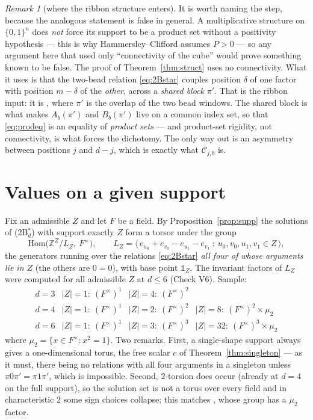 \documentclass[11pt]{article}
\theoremstyle{definition}
\theoremstyle{remark}
\newtheorem{remark}[theorem]{Remark}
\newcommand{\Z}{\mathbb{Z}}
\newcommand{\Cset}{\mathcal{C}}
\newcommand{\one}{\mathbb{1}}
\newcommand{\cube}{\{0,1\}}
\begin{document}
\begin{remark}[where the ribbon structure enters]\label{rem:whereribbon}
It is worth naming the step, because the analogous statement is false in general.  A
multiplicative structure on $\cube^{n}$ does \emph{not} force its support to be a product set
without a positivity hypothesis --- this is why Hammersley--Clifford assumes $P>0$ --- so any
argument here that used only ``connectivity of the cube'' would prove something known to be
false.  The proof of Theorem~\ref{thm:struct} uses no connectivity.  What it uses is that the
two-bead relation \eqref{eq:2Bstar} couples position $\delta$ of one factor with position
$m-\delta$ of the \emph{other}, across a \emph{shared block} $\pi'$.  That is the ribbon input:
it is \cite[Lemma 4.3]{Q149}, where $\pi'$ is the overlap of the two bead windows.  The shared
block is what makes $A_b(\pi')$ and $B_b(\pi')$ live on a common index set, so that
\eqref{eq:prodeq} is an equality of \emph{product sets} --- and product-set rigidity, not
connectivity, is what forces the dichotomy.  The only way out is an asymmetry between positions
$j$ and $d-j$, which is exactly what $\Cset_{j,b}$ is.
\end{remark}

\section{Values on a given support}\label{sec:values}

Fix an admissible $Z$ and let $F$ be a field.  By Proposition~\ref{prop:supp} the solutions of
\textnormal{(2B$^*_d$)} with support exactly $Z$ form a torsor under the group
\[
   \mathrm{Hom}\bigl(\Z^{Z}/L_Z,\ F^\times\bigr),\qquad
   L_Z=\bigl\langle\, e_{u_0}+e_{v_0}-e_{u_1}-e_{v_1}\ :\
      u_0,v_0,u_1,v_1\in Z \,\bigr\rangle ,
\]
the generators running over the relations \eqref{eq:2Bstar} \emph{all four of whose arguments lie
in $Z$} (the others are $0=0$), with base point $\one_Z$.  The invariant factors of $L_Z$ were
computed for all admissible $Z$ at $d\le6$ (Check V6).  Sample:
\[
\begin{array}{llll}
 d=3 & |Z|=1:\ (F^\times)^1 & |Z|=4:\ (F^\times)^2\\
 d=4 & |Z|=1:\ (F^\times)^1 & |Z|=2:\ (F^\times)^2 & |Z|=8:\ (F^\times)^2\times\mu_2\\
 d=6 & |Z|=1:\ (F^\times)^1 & |Z|=3:\ (F^\times)^3 & |Z|=32:\ (F^\times)^3\times\mu_2
\end{array}
\]
where $\mu_2=\{x\in F^\times:x^2=1\}$.  Two remarks.  First, a single-shape support always gives
a one-dimensional torus, the free scalar $c$ of Theorem~\ref{thm:singleton} --- as it must,
there being no relations with all four arguments in a singleton unless
$\pi0\pi'=\pi1\pi'$, which is impossible.  Second, $2$-torsion does occur (already at $d=4$ on
the full support), so the solution set is not a torus over every field and in characteristic
$2$ some sign choices collapse; this matches \cite[Cor.~5.4]{Q149}, whose group has a $\mu_2$
factor.
\end{document}
